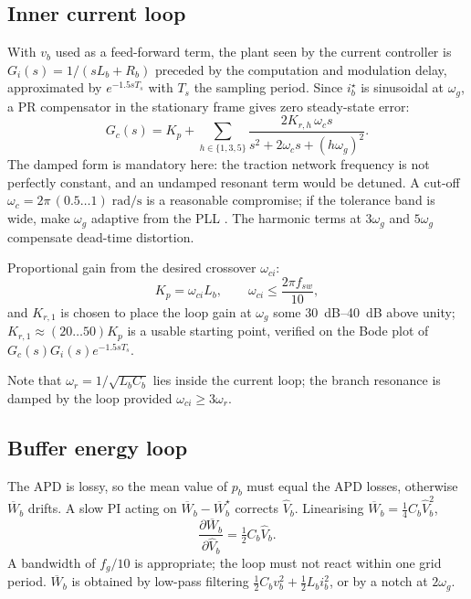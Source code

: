 \subsection{Inner current loop}

With $v_b$ used as a feed-forward term, the plant seen by the current controller
is $G_i(s) = 1/(sL_b+R_b)$ preceded by the computation and modulation delay,
approximated by $e^{-1.5 s T_s}$ with $T_s$ the sampling period. Since
$i_b^\star$ is sinusoidal at $\omega_g$, a PR compensator in the stationary
frame gives zero steady-state error:
\begin{equation}
G_c(s) = K_p + \sum_{h\in\{1,3,5\}} \frac{2K_{r,h}\,\omega_c s}{s^2 + 2\omega_c s + (h\omega_g)^2}.
\label{apdfb:eq:PR}
\end{equation}
The damped form is mandatory here: the traction network frequency is not
perfectly constant, and an undamped resonant term would be detuned. A cut-off
$\omega_c = 2\pi\,(0.5\ldots1)\;\si{\radian\per\second}$ is a reasonable
compromise; if the tolerance band is wide, make $\omega_g$ adaptive from the PLL
\cite{teodorescu2006pr}. The harmonic terms at $3\omega_g$ and $5\omega_g$
compensate dead-time distortion.

Proportional gain from the desired crossover $\omega_{ci}$:
\begin{equation}
K_p = \omega_{ci} L_b, \qquad \omega_{ci} \le \frac{2\pi f_{sw}}{10},
\end{equation}
and $K_{r,1}$ is chosen to place the loop gain at $\omega_g$ some
\SIrange{30}{40}{\deci\bel} above unity; $K_{r,1}\approx(20\ldots50)K_p$ is a
usable starting point, verified on the Bode plot of
$G_c(s)G_i(s)e^{-1.5sT_s}$.

Note that $\omega_r=1/\sqrt{L_bC_b}$ lies inside the current loop; the branch
resonance is damped by the loop provided $\omega_{ci}\ge 3\omega_r$.

\subsection{Buffer energy loop}

The APD is lossy, so the mean value of $p_b$ must equal the APD losses,
otherwise $\overline{W}_b$ drifts. A slow PI acting on
$\overline{W}_b - \overline{W}_b^\star$ corrects $\hat V_b$. Linearising
$\overline{W}_b = \tfrac14 C_b \hat V_b^2$,
\begin{equation}
\frac{\partial \overline{W}_b}{\partial \hat V_b} = \tfrac12 C_b\hat V_b .
\end{equation}
A bandwidth of $f_g/10$ is appropriate; the loop must not react within one grid
period. $\overline{W}_b$ is obtained by low-pass filtering
$\tfrac12 C_b v_b^2 + \tfrac12 L_b i_b^2$, or by a notch at $2\omega_g$.

